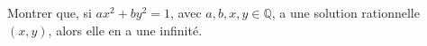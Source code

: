 Montrer que, si $ax^2 + by^2 = 1$, avec $a, b, x, y \in \mathbb{Q}$, a une solution rationnelle $(x, y)$, alors elle en a une infinité.
